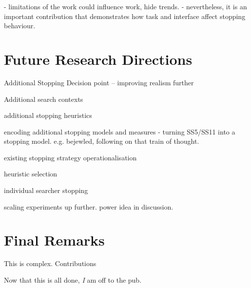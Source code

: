 - limitations of the work could influence work, hide trends.
- nevertheless, it is an important contribution that demonstrates how task and interface affect stopping behaviour.

\section{Future Research Directions}

Additional Stopping Decision point -- improving realism further

Additional search contexts

additional stopping heuristics

encoding additional stopping models and measures
    - turning SS5/SS11 into a stopping model. e.g. bejewled, following on that train of thought.

existing stopping strategy operationalisation

heuristic selection

individual searcher stopping

scaling experiments up further.
    power idea in discussion.


\section{Final Remarks}

This is complex. Contributions

Now that this is all done, \emph{I} am off to the pub.